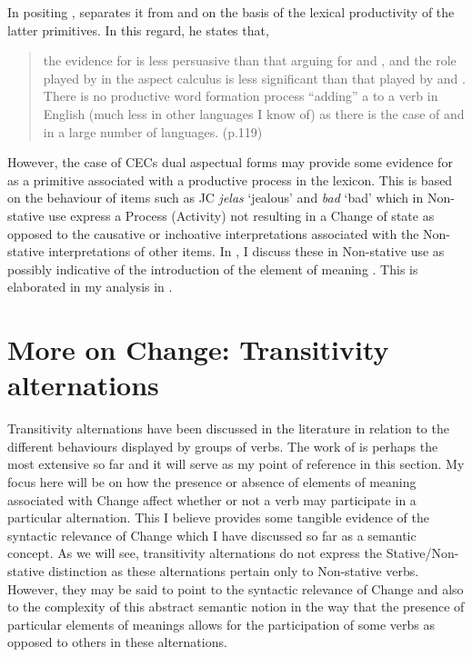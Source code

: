 In positing \DO, \citet{Dowty1979} separates it from \CAUSE and \BECOME
on the basis of the lexical productivity of the latter primitives. In
this regard, he states that,

\begin{quote}
the evidence for \DO is less persuasive than that arguing for \CAUSE and
\BECOME, and the role played by \DO in the aspect calculus is less
significant than that played by \CAUSE and \BECOME. There is no
productive word formation process “adding” a \DO to a verb in English
(much less in other languages I know of) as there is the case of \CAUSE
and \BECOME in a large number of languages. (p.119)
\end{quote}

However, the case of CECs dual aspectual forms may provide some
evidence for \DO as a primitive associated with a productive process in
the lexicon. This is based on the behaviour of items such as JC
\textit{jelas} `jealous' and \textit{bad} `bad' which in Non-stative
use express a Process (Activity) not resulting in a Change of state as
opposed to the causative or inchoative interpretations associated with
the Non-stative interpretations of other items.  In , I
discuss these in Non-stative use as possibly indicative of the
introduction of the element of meaning \DO. This is elaborated in my
analysis in .

\section{More on Change: Transitivity alternations}\label{sec:4.4}

Transitivity alternations have been discussed in the literature in
relation to the different behaviours displayed by groups of verbs.
The work of \citet{Levin1993} is perhaps the most extensive so far and
it will serve as my point of reference in this section.  My focus here
will be on how the presence or absence of elements of meaning
associated with Change affect whether or not a verb may participate in
a particular alternation.  This I believe provides some tangible
evidence of the syntactic relevance of Change which I have discussed
so far as a semantic concept.  As we will see, transitivity
alternations do not express the Stative\slash Non-stative distinction as
these alternations pertain only to Non-stative verbs.  However, they
may be said to point to the syntactic relevance of Change and also to
the complexity of this abstract semantic notion in the way that the
presence of particular elements of meanings allows for the
participation of some verbs as opposed to others in these
alternations.

